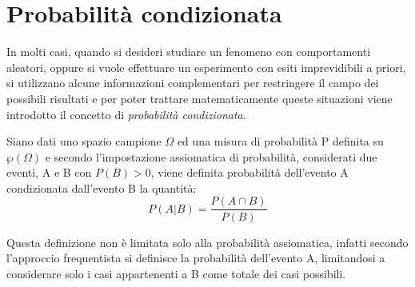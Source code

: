 \documentclass[a4paper,12pt, oneside]{book}
\begin{document}
\section{Probabilità condizionata}
In molti casi, quando si desideri studiare un fenomeno con comportamenti aleatori, oppure si vuole effettuare
un esperimento con esiti imprevidibili a priori, si utilizzano alcune informazioni complementari per restringere 
il campo dei possibili risultati e per poter trattare matematicamente queste situazioni viene introdotto
il concetto di \emph{probabilità condizionata}.

\begin{definizione}
Siano dati uno spazio campione $\Omega$ ed una misura di probabilità P definita su $\wp(\Omega)$ e
secondo l'impostazione assiomatica di probabilità, considerati due eventi, A e B con $P(B)>0$,
viene definita  probabilità dell'evento A condizionata dall'evento B la quantità:
\[P(A|B) = \frac{P(A\cap B)}{P(B)} \]
\end{definizione}
Questa definizione non è limitata solo alla probabilità assiomatica, infatti secondo l'approccio frequentista 
si definisce la probabilità dell'evento A, limitandosi a considerare solo i casi appartenenti a B come totale dei casi possibili.
\end{document}
